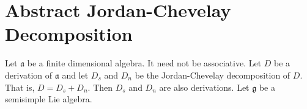 \documentclass[crop=false,class=article]{standalone}                           %
\begin{document}
    \section{Abstract Jordan-Chevelay Decomposition}
        Let $\mathfrak{a}$ be a finite dimensional algebra. It need not be
        associative. Let $D$ be a derivation of $\mathfrak{a}$ and let
        $D_{s}$ and $D_{n}$ be the Jordan-Chevelay decomposition of $D$. That
        is, $D=D_{s}+D_{n}$. Then $D_{s}$ and $D_{n}$ are also derivations. Let
        $\mathfrak{g}$ be a semisimple Lie algebra.
\end{document}
